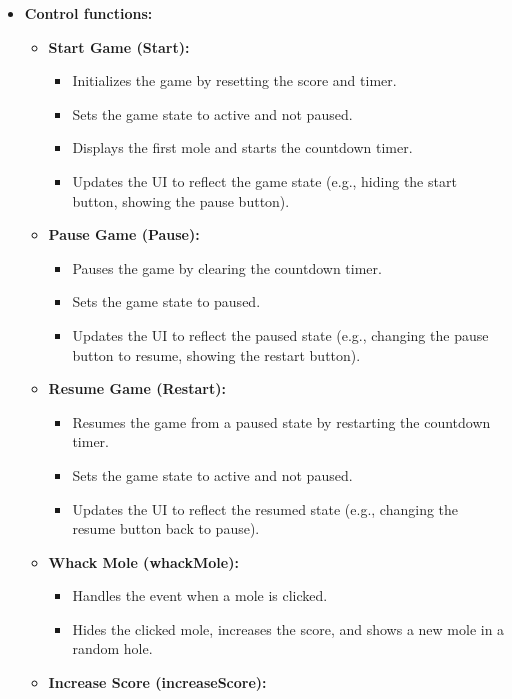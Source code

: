 \documentclass{article}
\begin{document}
\begin{itemize}
\begin{itemize}
    \end{itemize}
    \item \textbf{Control functions:}
    \begin{itemize}
        \item \textbf{Start Game (Start):} 
        \begin{itemize}
            \item Initializes the game by resetting the score and timer.
            \item Sets the game state to active and not paused.
            \item Displays the first mole and starts the countdown timer.
            \item Updates the UI to reflect the game state (e.g., hiding the start button, showing the pause button).
        \end{itemize}
        \item \textbf{Pause Game (Pause):} 
        \begin{itemize}
            \item Pauses the game by clearing the countdown timer.
            \item Sets the game state to paused.
            \item Updates the UI to reflect the paused state (e.g., changing the pause button to resume, showing the restart button).
        \end{itemize}
        \item \textbf{Resume Game (Restart):}
        \begin{itemize}
            \item Resumes the game from a paused state by restarting the countdown timer.
            \item Sets the game state to active and not paused.
            \item Updates the UI to reflect the resumed state (e.g., changing the resume button back to pause).
        \end{itemize}
        \item \textbf{Whack Mole (whackMole):}
        \begin{itemize}
            \item Handles the event when a mole is clicked.
            \item Hides the clicked mole, increases the score, and shows a new mole in a random hole.
        \end{itemize}
        \item \textbf{Increase Score (increaseScore):}

\end{itemize}
\end{itemize}
\end{document}

